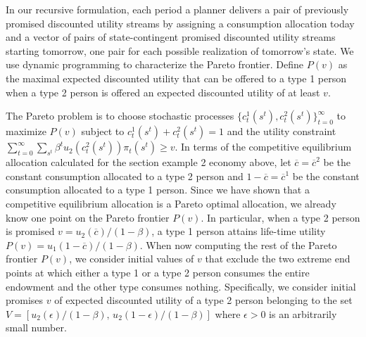 In our recursive formulation, each period a planner
delivers a pair of previously promised discounted
utility streams by assigning a consumption
allocation today and a vector of pairs of state-contingent
promised discounted utility streams starting tomorrow,
one pair for each possible realization of tomorrow's state.
We use dynamic programming to characterize the Pareto
frontier. Define $P(v)$ as the maximal expected discounted
utility that can be offered to a type 1 person when 
a type 2 person is offered an expected discounted
utility of at least $v$. 

The Pareto problem is to choose stochastic processes $\{c_t^1(s^t), c_t^2(s^t)\}_{t=0}^\infty$ to
 maximize
$P(v)$ subject to  $c_t^1(s^t) + c_t^2(s^t) =1$ and the utility constraint
$\sum_{t=0}^\infty \sum_{s^t} \beta^t u_2(c_t^2(s^t)) \pi_t(s^t) \geq v.$
In terms of the competitive equilibrium
allocation calculated for  the section  example 2  economy above,
let $\overline c= \overline c^2$ be the  constant consumption
allocated to a type 2 person and $1-\overline
c=\overline c^1$ be the constant consumption
allocated to a type 1 person.
Since we have shown that a competitive equilibrium allocation is
a Pareto optimal allocation, we already know one point on the
Pareto frontier $P(v)$. In particular, when a type 2 person is promised
$v= u_2(\overline c) / (1 - \beta) $, a type 1 person attains
life-time utility
$P(v) =  u_1(1-\overline c) / (1-\beta)$. 
When now computing the rest of the Pareto frontier $P(v)$, 
we consider initial values of $v$ that exclude the two
extreme end points at which either a type 1 or a type 2 person 
consumes the entire endowment and the other type consumes nothing.
 Specifically, we consider initial promises $v$ 
of expected discounted utility of a type 2 person 
belonging to the set
$V = [u_2(\epsilon) / (1-\beta),\,  
      u_2(1-\epsilon) / (1 -\beta)]$ 
where $\epsilon >0$ is an arbitrarily small number.






